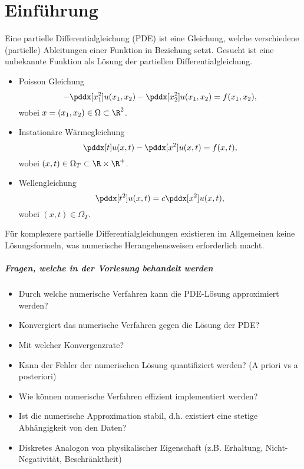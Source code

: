 \chapter{Einführung}


Eine partielle Differentialgleichung (PDE) ist eine Gleichung, welche verschiedene (partielle) Ableitungen einer Funktion in Beziehung setzt.
Gesucht ist eine unbekannte Funktion als Lösung der partiellen Differentialgleichung.

\begin{ex*}
	\begin{itemize}
		\item
			Poisson Gleichung
			\[
				- \pddx[x_1^2] u(x_1,x_2) - \pddx[x_2^2] u(x_1, x_2) = f(x_1, x_2),
			\]
			wobei $x = (x_1, x_2) \in \Omega \subset \R^2$.
		\item
			Instationäre Wärmegleichung
			\[
				\pddx[t] u(x,t) - \pddx[x^2] u(x,t) = f(x, t),
			\]
			wobei $(x, t) \in \Omega_T \subset \R \times \R^+$.
		\item
			Wellengleichung
			\[
				\pddx[t^2] u(x, t) = c \pddx[x^2] u(x,t),
			\]
			wobei $(x,t) \in \Omega_T$.
	\end{itemize}
\end{ex*}

Für komplexere partielle Differentialgleichungen existieren im Allgemeinen keine Lösungsformeln, was numerische Herangehensweisen erforderlich macht.

\paragraph{Fragen, welche in der Vorlesung behandelt werden}

\begin{itemize}
	\item
		Durch welche numerische Verfahren kann die PDE-Lösung approximiert werden?
	\item
		Konvergiert das numerische Verfahren gegen die Lösung der PDE?
	\item
		Mit welcher Konvergenzrate?
	\item
		Kann der Fehler der numerischen Lösung quantifiziert werden? (A priori vs a posteriori)
	\item
		Wie können numerische Verfahren effizient implementiert werden?
	\item
		Ist die numerische Approximation stabil, d.h. existiert eine stetige Abhängigkeit von den Daten?
	\item
		Diskretes Analogon von physikalischer Eigenschaft (z.B. Erhaltung, Nicht-Negativität, Beschränktheit)
\end{itemize}

